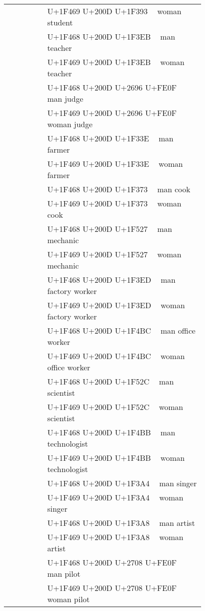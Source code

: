 \documentclass[a4paper,12pt]{ltjarticle}
\newcommand{\fontA}[1]{{\fontspec[RawFeature={mode=harf,+dist,+ccmp}]{Segoe UI Emoji} #1}}
\newcommand{\fontB}[1]{{\fontspec[RawFeature={mode=harf,+dist,+ccmp}]{Noto Color Emoji} #1}}
\begin{document}
\begin{longtable}[c]{ccp{0.8\linewidth}}
\fontA{👩‍🎓}&\fontB{👩‍🎓}&U+1F469 U+200D U+1F393 👩‍🎓 woman student\\
\fontA{👨‍🏫}&\fontB{👨‍🏫}&U+1F468 U+200D U+1F3EB 👨‍🏫 man teacher\\
\fontA{👩‍🏫}&\fontB{👩‍🏫}&U+1F469 U+200D U+1F3EB 👩‍🏫 woman teacher\\
\fontA{👨‍⚖️}&\fontB{👨‍⚖️}&U+1F468 U+200D U+2696 U+FE0F 👨‍⚖️ man judge\\
\fontA{👩‍⚖️}&\fontB{👩‍⚖️}&U+1F469 U+200D U+2696 U+FE0F 👩‍⚖️ woman judge\\
\fontA{👨‍🌾}&\fontB{👨‍🌾}&U+1F468 U+200D U+1F33E 👨‍🌾 man farmer\\
\fontA{👩‍🌾}&\fontB{👩‍🌾}&U+1F469 U+200D U+1F33E 👩‍🌾 woman farmer\\
\fontA{👨‍🍳}&\fontB{👨‍🍳}&U+1F468 U+200D U+1F373 👨‍🍳 man cook\\
\fontA{👩‍🍳}&\fontB{👩‍🍳}&U+1F469 U+200D U+1F373 👩‍🍳 woman cook\\
\fontA{👨‍🔧}&\fontB{👨‍🔧}&U+1F468 U+200D U+1F527 👨‍🔧 man mechanic\\
\fontA{👩‍🔧}&\fontB{👩‍🔧}&U+1F469 U+200D U+1F527 👩‍🔧 woman mechanic\\
\fontA{👨‍🏭}&\fontB{👨‍🏭}&U+1F468 U+200D U+1F3ED 👨‍🏭 man factory worker\\
\fontA{👩‍🏭}&\fontB{👩‍🏭}&U+1F469 U+200D U+1F3ED 👩‍🏭 woman factory worker\\
\fontA{👨‍💼}&\fontB{👨‍💼}&U+1F468 U+200D U+1F4BC 👨‍💼 man office worker\\
\fontA{👩‍💼}&\fontB{👩‍💼}&U+1F469 U+200D U+1F4BC 👩‍💼 woman office worker\\
\fontA{👨‍🔬}&\fontB{👨‍🔬}&U+1F468 U+200D U+1F52C 👨‍🔬 man scientist\\
\fontA{👩‍🔬}&\fontB{👩‍🔬}&U+1F469 U+200D U+1F52C 👩‍🔬 woman scientist\\
\fontA{👨‍💻}&\fontB{👨‍💻}&U+1F468 U+200D U+1F4BB 👨‍💻 man technologist\\
\fontA{👩‍💻}&\fontB{👩‍💻}&U+1F469 U+200D U+1F4BB 👩‍💻 woman technologist\\
\fontA{👨‍🎤}&\fontB{👨‍🎤}&U+1F468 U+200D U+1F3A4 👨‍🎤 man singer\\
\fontA{👩‍🎤}&\fontB{👩‍🎤}&U+1F469 U+200D U+1F3A4 👩‍🎤 woman singer\\
\fontA{👨‍🎨}&\fontB{👨‍🎨}&U+1F468 U+200D U+1F3A8 👨‍🎨 man artist\\
\fontA{👩‍🎨}&\fontB{👩‍🎨}&U+1F469 U+200D U+1F3A8 👩‍🎨 woman artist\\
\fontA{👨‍✈️}&\fontB{👨‍✈️}&U+1F468 U+200D U+2708 U+FE0F 👨‍✈️ man pilot\\
\fontA{👩‍✈️}&\fontB{👩‍✈️}&U+1F469 U+200D U+2708 U+FE0F 👩‍✈️ woman pilot\\

\end{longtable}
\end{document}
